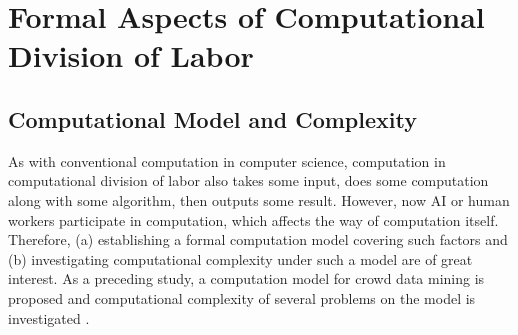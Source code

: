 \section{Formal Aspects of Computational Division of Labor}

\subsection{Computational Model and Complexity}
 
As with conventional computation in computer science, computation in
computational division of labor also takes some input, does some
computation along with some algorithm, then outputs some
result. However, now AI or human workers participate in computation,
which affects the way of computation itself. Therefore, (a)
establishing a formal computation model covering such factors and (b)
investigating computational complexity under such a model are of great
interest. As a preceding study, a computation model for crowd data
mining is proposed and computational complexity of several problems on
the model is investigated \cite{AM14}.

